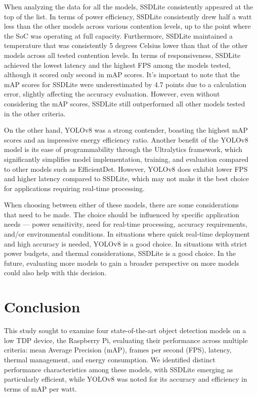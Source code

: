 \documentclass[10pt,twocolumn,letterpaper]{article}
\begin{document}
When analyzing the data for all the models, SSDLite consistently appeared at the top of the list. In terms of power efficiency, SSDLite consistently drew half a watt less than the other models across various contention levels, up to the point where the SoC was operating at full capacity. Furthermore, SSDLite maintained a temperature that was consistently 5 degrees Celsius lower than that of the other models across all tested contention levels. In terms of responsiveness, SSDLite achieved the lowest latency and the highest FPS among the models tested, although it scored only second in mAP scores. It's important to note that the mAP scores for SSDLite were underestimated by 4.7 points due to a calculation error, slightly affecting the accuracy evaluation. However, even without considering the mAP scores, SSDLite still outperformed all other models tested in the other criteria.

On the other hand, YOLOv8 was a strong contender, boasting the highest mAP scores and an impressive energy efficiency ratio. Another benefit of the YOLOv8 model is its ease of programmability through the Ultralytics framework, which significantly simplifies model implementation, training, and evaluation compared to other models such as EfficientDet. However, YOLOv8 does exhibit lower FPS and higher latency compared to SSDLite, which may not make it the best choice for applications requiring real-time processing.

When choosing between either of these models, there are some considerations that need to be made. The choice should be influenced by specific application needs — power sensitivity, need for real-time processing, accuracy requirements, and/or environmental conditions. In situations where quick real-time deployment and high accuracy is needed, YOLOv8 is a good choice. In situations with strict power budgets, and thermal considerations, SSDLite is a good  choice. In the future, evaluating more models to gain a broader perspective on more models could also help with this decision.

\section{Conclusion}
This study sought to examine four state-of-the-art object detection models on a low TDP device, the Raspberry Pi, evaluating their performance across multiple criteria: mean Average Precision (mAP), frames per second (FPS), latency, thermal management, and energy consumption. We identified distinct performance characteristics among these models, with SSDLite emerging as particularly efficient, while YOLOv8 was noted for its accuracy and efficiency in terms of mAP per watt.
\end{document}
